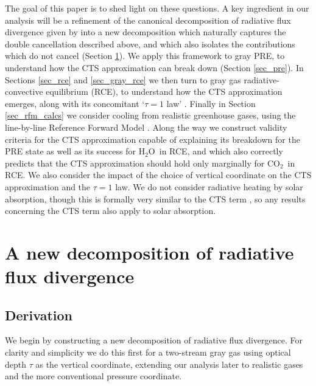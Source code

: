 \documentclass{ametsoc}
\newcommand{\Wmsq}{\ensuremath{\mathrm{W/m^2}}}
\newcommand{\cminverse}{\ensuremath{\mathrm{cm^{-1}}}}
\newcommand{\cotwo}{\ensuremath{\mathrm{CO_2}}}
\newcommand{\htwo}{\ensuremath{\mathrm{H_2O}}}
\newcommand{\tauk}{\ensuremath{\tau_k}}
\begin{document}
The goal of this paper is to shed light on these questions.   A key ingredient in our analysis will be a refinement of the canonical decomposition of radiative flux divergence given by \cite{green1967} into a new decomposition which naturally captures the  double cancellation described above, and which also isolates the contributions which do not cancel (Section \ref{sec_new_decomp}).  We apply this framework to gray PRE, to understand how the CTS approximation can break down (Section \ref{sec_pre}).  In Sections \ref{sec_rce} and \ref{sec_gray_rce} we then turn to  gray gas radiative-convective equilibrium (RCE), to understand how the CTS approximation emerges, along with its concomitant `$\tau=1$ law' \citep{huang2014}. Finally in Section \ref{sec_rfm_calcs} we consider cooling from realistic greenhouse gases,  using the line-by-line Reference Forward Model \citep{dudhia2017}. Along the way we construct  validity criteria for the CTS approximation capable of explaining its breakdown for the PRE state as well as its success for  \htwo\ in RCE, and which also correctly predicts that the CTS approximation should hold  only marginally for \cotwo\ in RCE.  We also consider the impact of the choice of vertical coordinate  on the CTS approximation and the $\tau=1$ law. We do not consider radiative heating by solar absorption, though this is formally very similar to the CTS term \citep[e.g.][]{jeevanjee2018},  so any results concerning the CTS term also apply to solar absorption.


\section{A new decomposition of radiative flux divergence} \label{sec_new_decomp}
\subsection{Derivation} \label{sec_derivation}
We begin by constructing a new decomposition of radiative flux divergence. For clarity and simplicity we do this first for a two-stream gray gas using optical depth $\tau$ as the vertical coordinate, extending our analysis later to realistic gases and the more conventional pressure coordinate.

\end{document}
